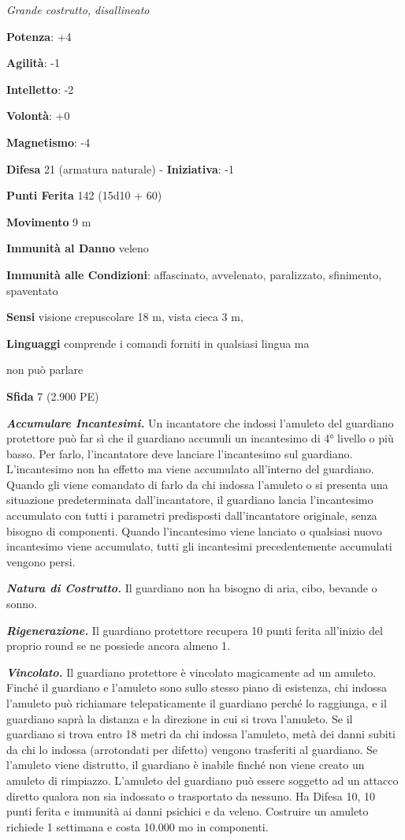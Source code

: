 \begin{multicols}{2}
\emph{Grande costrutto, disallineato}

\textbf{Potenza}: +4

\textbf{Agilità}: -1

\textbf{Intelletto}: -2

\textbf{Volontà}: +0

\textbf{Magnetismo}: -4

\textbf{Difesa} 21 (armatura naturale) - \textbf{Iniziativa}: -1

\textbf{Punti Ferita} 142 (15d10 + 60)

\textbf{Movimento} 9 m

\textbf{Immunità al Danno} veleno

\textbf{Immunità alle Condizioni}: affascinato, avvelenato, paralizzato,
sfinimento, spaventato

\textbf{Sensi} visione crepuscolare 18 m, vista cieca 3 m, 

\textbf{Linguaggi} comprende i comandi forniti in qualsiasi lingua ma

non può parlare

\textbf{Sfida} 7 (2.900 PE)\smallskip

\emph{\textbf{Accumulare Incantesimi.}} Un incantatore che indossi
l'amuleto del guardiano protettore può far sì che il guardiano accumuli
un incantesimo di 4° livello o più basso. Per farlo, l'incantatore deve
lanciare l'incantesimo sul guardiano. L'incantesimo non ha effetto ma
viene accumulato all'interno del guardiano. Quando gli viene comandato
di farlo da chi indossa l'amuleto o si presenta una situazione
predeterminata dall'incantatore, il guardiano lancia l'incantesimo
accumulato con tutti i parametri predisposti dall'incantatore originale,
senza bisogno di componenti. Quando l'incantesimo viene lanciato o
qualsiasi nuovo incantesimo viene accumulato, tutti gli incantesimi
precedentemente accumulati vengono persi.

\emph{\textbf{Natura di Costrutto.}} Il guardiano non ha bisogno di
aria, cibo, bevande o sonno.

\emph{\textbf{Rigenerazione.}} Il guardiano protettore recupera 10 punti
ferita all'inizio del proprio round se ne possiede ancora almeno 1.

\emph{\textbf{Vincolato.}} Il guardiano protettore è vincolato
magicamente ad un amuleto. Finché il guardiano e l'amuleto sono sullo
stesso piano di esistenza, chi indossa l'amuleto può richiamare
telepaticamente il guardiano perché lo raggiunga, e il guardiano saprà
la distanza e la direzione in cui si trova l'amuleto. Se il guardiano si
trova entro 18 metri da chi indossa l'amuleto, metà dei danni subiti da
chi lo indossa (arrotondati per difetto) vengono trasferiti al
guardiano. Se l'amuleto viene distrutto, il guardiano è inabile finché
non viene creato un amuleto di rimpiazzo. L'amuleto del guardiano può
essere soggetto ad un attacco diretto qualora non sia indossato o
trasportato da nessuno. Ha Difesa 10, 10 punti ferita e immunità ai danni
psichici e da veleno. Costruire un amuleto richiede 1 settimana e costa
10.000 mo in componenti.


\end{multicols}
